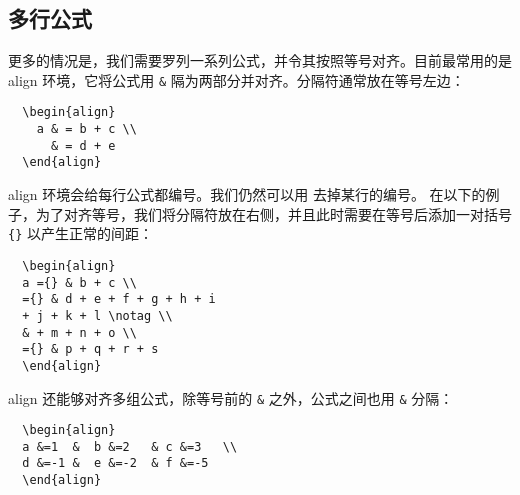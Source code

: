 \subsection{多行公式}
更多的情况是，我们需要罗列一系列公式，并令其按照等号对齐。目前最常用的是 align 环境，它将公式用 \texttt\& 隔为两部分并对齐。分隔符通常放在等号左边：
\begin{lstlisting}
  \begin{align}
    a & = b + c \\
      & = d + e
  \end{align}
\end{lstlisting}
\begin{center}
\end{center}
align 环境会给每行公式都编号。我们仍然可以用  去掉某行的编号。
在以下的例子，为了对齐等号，我们将分隔符放在右侧，并且此时需要在等号后添加一对括号 \texttt\{\texttt\} 以产生正常的间距：
\begin{lstlisting}
  \begin{align}
  a ={} & b + c \\
  ={} & d + e + f + g + h + i
  + j + k + l \notag \\
  & + m + n + o \\
  ={} & p + q + r + s
  \end{align}
\end{lstlisting}
\begin{center}
\end{center}
align 还能够对齐多组公式，除等号前的 \texttt\& 之外，公式之间也用 \texttt\& 分隔：
\begin{lstlisting}
  \begin{align}
  a &=1  &  b &=2   & c &=3   \\
  d &=-1 &  e &=-2  & f &=-5
  \end{align}
\end{lstlisting}
\begin{center}
\end{center}
